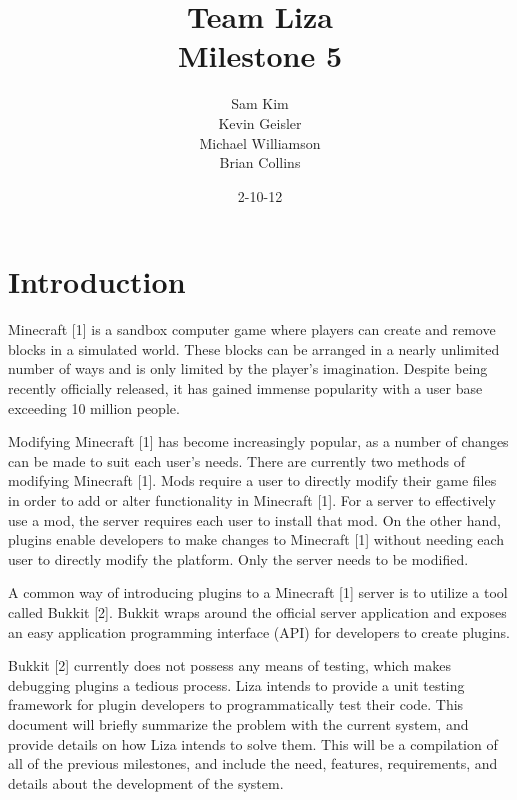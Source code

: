 \documentclass{article}
\title{Team Liza \\ Milestone 5}
\author{Sam Kim \\ Kevin Geisler \\ Michael Williamson \\ Brian Collins}
\date{2-10-12}
\begin{document}
\maketitle
\newpage

\tableofcontents

\newpage

\section{Introduction}

\noindent   

Minecraft [1] is a sandbox computer game where players can create and remove blocks in a simulated world. 
These blocks can be arranged in a nearly unlimited number of ways and is only limited by the player's imagination.
 Despite being recently officially released, it has gained immense popularity with a user base exceeding 10 million people. \newline

\noindent Modifying Minecraft [1] has become increasingly popular, as a number of changes can be made to suit each user’s needs.
 There are currently two methods of modifying Minecraft [1]. Mods require a user to directly modify their game files in order to add 
or alter functionality in Minecraft [1]. For a server to effectively use a mod, the server requires each user to install that mod. On the 
other hand, plugins enable developers to make changes to Minecraft [1] without needing each user to directly modify the platform. 
Only the server needs to be modified. \newline 

\noindent A common way of introducing plugins to a Minecraft [1] server is to utilize a tool called Bukkit [2]. Bukkit wraps around the official
 server application and exposes an easy application programming interface (API) for developers to create plugins.  \newline

\noindent Bukkit [2] currently does not possess any means of testing, which makes debugging plugins a tedious process. Liza intends to 
provide a unit testing framework for plugin developers to programmatically test their code.  This document will briefly summarize the 
problem with the current system, and provide details on how Liza intends to solve them. This will be a compilation of all of the previous
 milestones, and include the need, features, requirements, and details about the development of the system.
\end{document}

